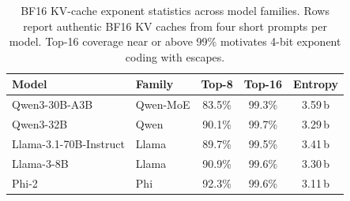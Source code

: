 \begin{table}[t]
\centering
\small
\caption{BF16 KV-cache exponent statistics across model families. Rows report authentic BF16 KV caches from four short prompts per model. Top-16 coverage near or above 99\% motivates 4-bit exponent coding with escapes.}
\label{tab:exponent}
\begin{tabular}{llccc}
\toprule
Model & Family & Top-8 & Top-16 & Entropy \\
\midrule
Qwen3-30B-A3B & Qwen-MoE & 83.5\% & 99.3\% & 3.59\,b \\
Qwen3-32B & Qwen & 90.1\% & 99.7\% & 3.29\,b \\
Llama-3.1-70B-Instruct & Llama & 89.7\% & 99.5\% & 3.41\,b \\
Llama-3-8B & Llama & 90.9\% & 99.6\% & 3.30\,b \\
Phi-2 & Phi & 92.3\% & 99.6\% & 3.11\,b \\
\bottomrule
\end{tabular}
\end{table}
